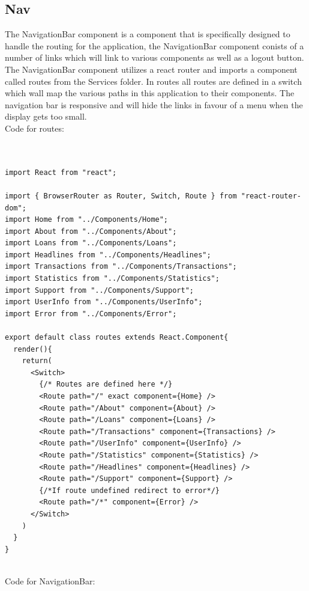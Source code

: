 \subsection{Nav}
The NavigationBar component is a component that is specifically designed to handle the routing
for the application, the NavigationBar component conists of a number of links which will link
to various components as well as a logout button.
The NavigationBar component utilizes a react router and imports a component
called routes from the Services folder.  In routes all routes are defined in a switch which
wall map the various paths in this application to their components.  The navigation bar is responsive
and will hide the links in favour of a menu when the display gets too small.
\\
Code for routes:
\begin{verbatim}


import React from "react";

import { BrowserRouter as Router, Switch, Route } from "react-router-dom";
import Home from "../Components/Home";
import About from "../Components/About";
import Loans from "../Components/Loans";
import Headlines from "../Components/Headlines";
import Transactions from "../Components/Transactions";
import Statistics from "../Components/Statistics";
import Support from "../Components/Support";
import UserInfo from "../Components/UserInfo";
import Error from "../Components/Error";

export default class routes extends React.Component{
  render(){
    return(
      <Switch>
        {/* Routes are defined here */}
        <Route path="/" exact component={Home} />
        <Route path="/About" component={About} />
        <Route path="/Loans" component={Loans} />
        <Route path="/Transactions" component={Transactions} />
        <Route path="/UserInfo" component={UserInfo} />
        <Route path="/Statistics" component={Statistics} />
        <Route path="/Headlines" component={Headlines} />
        <Route path="/Support" component={Support} />
        {/*If route undefined redirect to error*/}
        <Route path="/*" component={Error} />
      </Switch>
    )
  }
}

\end{verbatim}
\\
Code for NavigationBar:
